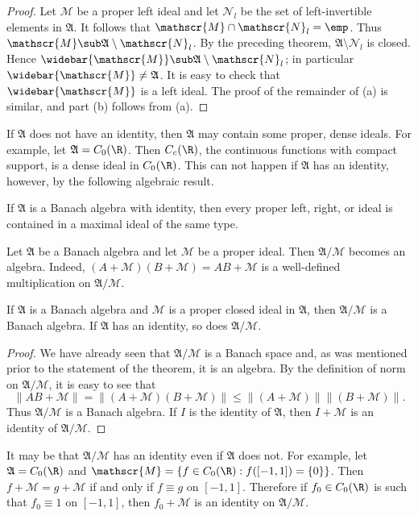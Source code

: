 \begin{proof}
Let $\mathscr{M}$ be a proper left ideal and let $\mathscr{N}_l$ be the set of left-invertible elements in $\mathfrak{A}$. It follows that $\mathscr{M}\cap\mathscr{N}_l=\emp$. Thus $\mathscr{M}\sub\mathfrak{A}\setminus\mathscr{N}_l$. By the preceding theorem, $\mathfrak{A}\setminus\mathscr{N}_l$ is closed. Hence $\widebar{\mathscr{M}}\sub\mathfrak{A}\setminus\mathscr{N}_l$; in particular $\widebar{\mathscr{M}}\neq\mathfrak{A}$. It is easy to check that $\widebar{\mathscr{M}}$ is a left ideal. The proof of the remainder of (a) is similar, and part (b) follows from (a).
\end{proof}
If $\mathfrak{A}$ does not have an identity, then $\mathfrak{A}$ may contain some proper, dense ideals. For example, let $\mathfrak{A}=C_0(\R)$. Then $C_c(\R)$, the continuous functions with compact support, is a dense ideal in $C_0(\R)$. This can not happen if $\mathfrak{A}$ has an identity, however, by the following algebraic result.
\begin{proposition}
If $\mathfrak{A}$ is a Banach algebra with identity, then every proper left, right, or ideal is contained in a maximal ideal of the same type.
\end{proposition}
Let $\mathfrak{A}$ be a Banach algebra and let $\mathscr{M}$ be a proper ideal. Then $\mathfrak{A}/\mathscr{M}$ becomes an algebra. Indeed, $(A+\mathscr{M})(B+\mathscr{M})=AB+\mathscr{M}$ is a well-defined multiplication on $\mathfrak{A}/\mathscr{M}$.
\begin{theorem}
If $\mathfrak{A}$ is a Banach algebra and $\mathscr{M}$ is a proper closed ideal in $\mathfrak{A}$, then $\mathfrak{A}/\mathscr{M}$ is a Banach algebra. If $\mathfrak{A}$ has an identity, so does $\mathfrak{A}/\mathscr{M}$.
\end{theorem}
\begin{proof}
We have already seen that $\mathfrak{A}/\mathscr{M}$ is a Banach space and, as was mentioned prior to the statement of the theorem, it is an algebra. By the definition of norm on $\mathfrak{A}/\mathscr{M}$, it is easy to see that
\[\|AB+\mathscr{M}\|=\|(A+\mathscr{M})(B+\mathscr{M})\|\leq\|(A+\mathscr{M})\|\|(B+\mathscr{M})\|.\]
Thus $\mathfrak{A}/\mathscr{M}$ is a Banach algebra. If $I$ is the identity of $\mathfrak{A}$, then $I+\mathscr{M}$ is an identity of $\mathfrak{A}/\mathscr{M}$.
\end{proof}
It may be that $\mathfrak{A}/\mathscr{M}$ has an identity even if $\mathfrak{A}$ does not. For example, let $\mathfrak{A}=C_0(\R)$ and $\mathscr{M}=\{f\in C_0(\R):f([-1,1])=\{0\}\}$. Then $f+\mathscr{M}=g+\mathscr{M}$ if and only if $f\equiv g$ on $[-1,1]$. Therefore if $f_0\in C_0(\R)$ is such that $f_0\equiv 1$ on $[-1,1]$, then $f_0+\mathscr{M}$ is an identity on $\mathfrak{A}/\mathscr{M}$.
